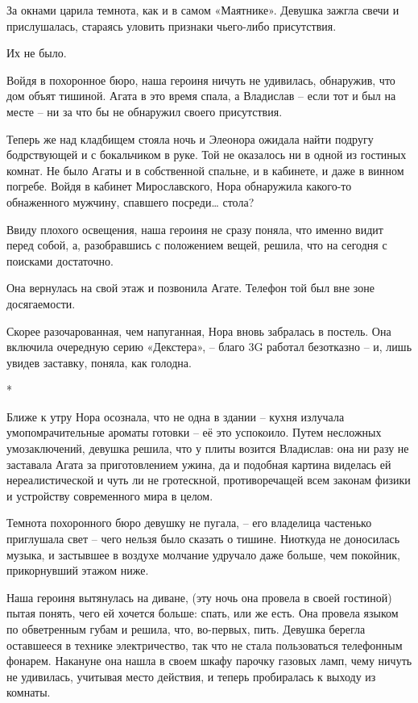 \documentclass[
  a5paperpaper,
  DIV=11,
  numbers=noendperiod]{scrreprt}
\begin{document}
За окнами царила темнота, как и в самом «Маятнике». Девушка зажгла свечи
и прислушалась, стараясь уловить признаки чьего-либо присутствия.

Их не было.

Войдя в похоронное бюро, наша героиня ничуть не удивилась, обнаружив,
что дом объят тишиной. Агата в это время спала, а Владислав -- если тот
и был на месте -- ни за что бы не обнаружил своего присутствия.

Теперь же над кладбищем стояла ночь и Элеонора ожидала найти подругу
бодрствующей и с бокальчиком в руке. Той не оказалось ни в одной из
гостиных комнат. Не было Агаты и в собственной спальне, и в кабинете, и
даже в винном погребе. Войдя в кабинет Мирославского, Нора обнаружила
какого-то обнаженного мужчину, спавшего посреди\ldots{} стола?

Ввиду плохого освещения, наша героиня не сразу поняла, что именно видит
перед собой, а, разобравшись с положением вещей, решила, что на сегодня
с поисками достаточно.

Она вернулась на свой этаж и позвонила Агате. Телефон той был вне зоне
досягаемости.

Скорее разочарованная, чем напуганная, Нора вновь забралась в постель.
Она включила очередную серию «Декстера», -- благо 3G работал безотказно
-- и, лишь увидев заставку, поняла, как голодна.

*

Ближе к утру Нора осознала, что не одна в здании -- кухня излучала
умопомрачительные ароматы готовки -- её это успокоило. Путем несложных
умозаключений, девушка решила, что у плиты возится Владислав: она ни
разу не заставала Агата за приготовлением ужина, да и подобная картина
виделась ей нереалистической и чуть ли не гротескной, противоречащей
всем законам физики и устройству современного мира в целом.

Темнота похоронного бюро девушку не пугала, -- его владелица частенько
приглушала свет -- чего нельзя было сказать о тишине. Ниоткуда не
доносилась музыка, и застывшее в воздухе молчание удручало даже больше,
чем покойник, прикорнувший этажом ниже.

Наша героиня вытянулась на диване, (эту ночь она провела в своей
гостиной) пытая понять, чего ей хочется больше: спать, или же есть. Она
провела языком по обветренным губам и решила, что, во-первых, пить.
Девушка берегла оставшееся в технике электричество, так что не стала
пользоваться телефонным фонарем. Накануне она нашла в своем шкафу
парочку газовых ламп, чему ничуть не удивилась, учитывая место действия,
и теперь пробиралась к выходу из комнаты.
\end{document}
